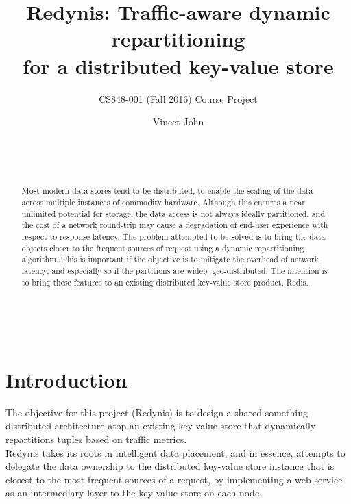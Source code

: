 \documentclass{sig-alternate}
\begin{document}
\title{Redynis: Traffic-aware dynamic repartitioning\\for a distributed key-value store}
\subtitle{CS848-001 (Fall 2016) Course Project}


\author{
	\alignauthor Vineet John\\
	\\
	\\
	\\
}


\maketitle
\begin{abstract}
Most modern data stores tend to be distributed, to enable the scaling of the data across multiple instances of commodity hardware. Although this ensures a near unlimited potential for storage, the data access is not always ideally partitioned, and the cost of a network round-trip may cause a degradation of end-user experience with respect to response latency. The problem attempted to be solved is to bring the data objects closer to the frequent sources of request using a dynamic repartitioning algorithm. This is important if the objective is to mitigate the overhead of network latency, and especially so if the partitions are widely geo-distributed. The intention is to bring these features to an existing distributed key-value store product, Redis\cite{redis-website}.\\
\end{abstract}


\\


\section{Introduction}
The objective for this project (Redynis) is to design a shared-something distributed architecture atop an existing key-value store that dynamically repartitions tuples based on traffic metrics.\\

Redynis takes its roots in intelligent data placement, and in essence, attempts to delegate the data ownership to the distributed key-value store instance that is closest to the most frequent sources of a request, by implementing a web-service as an intermediary layer to the key-value store on each node.\\
\end{document}

